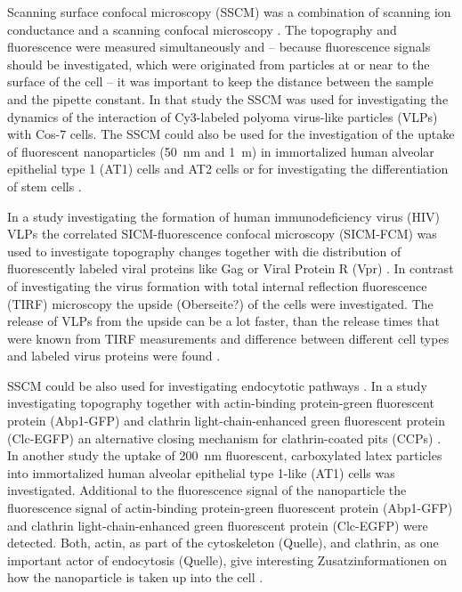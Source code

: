 Scanning surface confocal microscopy (SSCM) was a combination of scanning ion conductance and a 
scanning confocal microscopy \cite{Gorelik2002}. The topography and fluorescence were measured
simultaneously and -- because fluorescence signals should be investigated, which were originated
from particles at or near to the surface of the cell -- it was important to keep the distance 
between the sample and the pipette constant. In that study the SSCM was used for investigating the 
dynamics of the interaction of Cy3-labeled polyoma virus-like particles (VLPs) with Cos-7 cells. 
The SSCM could also be used for the investigation of the uptake of fluorescent nanoparticles 
(50~nm and 1~{\textmu}m) in immortalized human alveolar epithelial type 1 (AT1) cells and AT2 
cells \cite{Kemp2008} or for investigating the differentiation of stem cells \cite{Gorelik2008}.

In a study investigating the formation of human immunodeficiency virus (HIV) VLPs the correlated
SICM-fluorescence confocal microscopy (SICM-FCM) was used to investigate topography changes
together with die distribution of fluorescently labeled viral proteins like Gag or Viral Protein R 
(Vpr) \cite{Bednarska2020}. In contrast of investigating the virus formation with total internal 
reflection fluorescence (TIRF) microscopy \cite{Jouvenet2008} the upside (Oberseite?) of the cells 
were investigated. The release of VLPs from the upside can be a lot faster, than the release times 
that were known from TIRF measurements and difference between different cell types and labeled 
virus proteins were found \cite{Bednarska2020}. 

SSCM could be also used for investigating endocytotic pathways \cite{Shevchuk2008}. In a study 
investigating topography together with actin-binding protein-green fluorescent protein (Abp1-GFP)
and clathrin light-chain-enhanced green fluorescent protein (Clc-EGFP) an alternative closing 
mechanism for clathrin-coated pits (CCPs) \cite{Shevchuk2012}. In another study the uptake of
200~nm fluorescent, carboxylated latex particles into immortalized human alveolar epithelial type
1-like (AT1) cells was investigated. Additional to the fluorescence signal of the nanoparticle the 
fluorescence signal of actin-binding protein-green fluorescent protein (Abp1-GFP) and clathrin
light-chain-enhanced green fluorescent protein (Clc-EGFP) were detected. Both, actin, as part of
the cytoskeleton (Quelle), and clathrin, as one important actor of endocytosis (Quelle), give 
interesting Zusatzinformationen on how the nanoparticle is taken up into the cell 
\cite{Novak2014}. 

